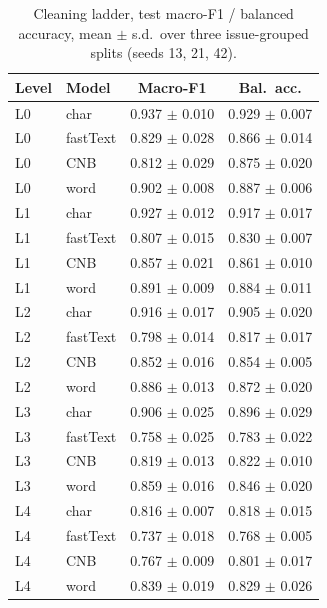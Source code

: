 \begin{table}[h]\centering\small\caption{Cleaning ladder, test macro-F1 / balanced accuracy, mean $\pm$ s.d.\ over three issue-grouped splits (seeds 13, 21, 42).}
\begin{tabular}{@{}llcc@{}}\toprule Level & Model & Macro-F1 & Bal.\ acc. \\ \midrule
L0 & char & 0.937 $\pm$ 0.010 & 0.929 $\pm$ 0.007 \\
L0 & fastText & 0.829 $\pm$ 0.028 & 0.866 $\pm$ 0.014 \\
L0 & CNB & 0.812 $\pm$ 0.029 & 0.875 $\pm$ 0.020 \\
L0 & word & 0.902 $\pm$ 0.008 & 0.887 $\pm$ 0.006 \\
L1 & char & 0.927 $\pm$ 0.012 & 0.917 $\pm$ 0.017 \\
L1 & fastText & 0.807 $\pm$ 0.015 & 0.830 $\pm$ 0.007 \\
L1 & CNB & 0.857 $\pm$ 0.021 & 0.861 $\pm$ 0.010 \\
L1 & word & 0.891 $\pm$ 0.009 & 0.884 $\pm$ 0.011 \\
L2 & char & 0.916 $\pm$ 0.017 & 0.905 $\pm$ 0.020 \\
L2 & fastText & 0.798 $\pm$ 0.014 & 0.817 $\pm$ 0.017 \\
L2 & CNB & 0.852 $\pm$ 0.016 & 0.854 $\pm$ 0.005 \\
L2 & word & 0.886 $\pm$ 0.013 & 0.872 $\pm$ 0.020 \\
L3 & char & 0.906 $\pm$ 0.025 & 0.896 $\pm$ 0.029 \\
L3 & fastText & 0.758 $\pm$ 0.025 & 0.783 $\pm$ 0.022 \\
L3 & CNB & 0.819 $\pm$ 0.013 & 0.822 $\pm$ 0.010 \\
L3 & word & 0.859 $\pm$ 0.016 & 0.846 $\pm$ 0.020 \\
L4 & char & 0.816 $\pm$ 0.007 & 0.818 $\pm$ 0.015 \\
L4 & fastText & 0.737 $\pm$ 0.018 & 0.768 $\pm$ 0.005 \\
L4 & CNB & 0.767 $\pm$ 0.009 & 0.801 $\pm$ 0.017 \\
L4 & word & 0.839 $\pm$ 0.019 & 0.829 $\pm$ 0.026 \\
\bottomrule\end{tabular}\label{tab:s1}\end{table}
